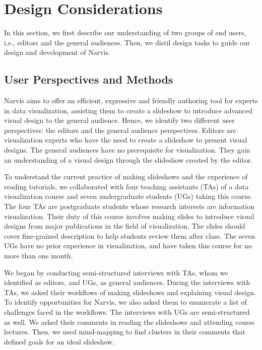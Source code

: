 \section{Design Considerations}\label{sec:design_task}
In this section, we first describe our understanding of two groups of end users, i.e., editors and the general audiences. Then, we distil design tasks to guide our design and development of Narvis.

\subsection{User Perspectives and Methods}

Narvis aims to offer an efficient, expressive and friendly authoring tool for experts in data visualization, assisting them to create a slideshow to introduce advanced visual design to the general audience.  
Hence, we identify two different user perspectives: the editors and the general audience perspectives. Editors are visualization experts who have the need to create a slideshow to present visual designs. The general audiences have no prerequisite for visualization. They gain an understanding of a visual design through the slideshow created by the editor. 

To understand the current practice of making slideshows and the experience of reading tutorials, we collaborated with four teaching assistants (TAs) of a data visualization course and seven undergraduate students (UGs) taking this course. The four TAs are postgraduate students whose research interests are information visualization. Their duty of this course involves making slides to introduce visual designs from major publications in the field of visualization. The slides should cover fine-grained description to help students review them after class. The seven UGs have no prior experience in visualization, and have taken this course for no more than one month.  

We began by conducting semi-structured interviews with TAs, whom we identified as editors, and UGs, as general audiences. During the interviews with TAs, we asked their workflows of making slideshows and explaining visual design. To identify opportunities for Narvis, we also asked them to enumerate a list of challenges faced in the workflows. The interviews with UGs are semi-structured as well. We asked their comments in reading the slideshows and attending course lectures. Then, we used mind-mapping to find clusters in their comments that defined goals for an ideal slideshow. 


